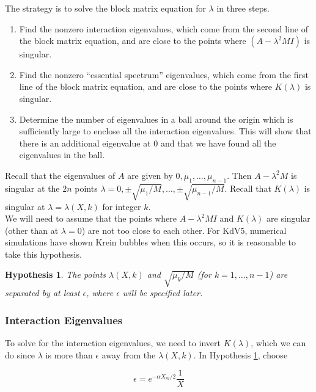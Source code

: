 \documentclass[12pt]{article}
\newtheorem{hypothesis}{Hypothesis}
\begin{document}
The strategy is to solve the block matrix equation for $\lambda$ in three steps.

\begin{enumerate}
	\item Find the nonzero interaction eigenvalues, which come from the second line of the block matrix equation, and are close to the points where $(A - \lambda^2 M I)$ is singular.
	\item Find the nonzero ``essential spectrum'' eigenvalues, which come from the first line of the block matrix equation, and are close to the points where $K(\lambda)$ is singular.
	\item Determine the number of eigenvalues in a ball around the origin which is sufficiently large to enclose all the interaction eigenvalues. This will show that there is an additional eigenvalue at 0 and that we have found all the eigenvalues in the ball.
\end{enumerate}

Recall that the eigenvalues of $A$ are given by $0, \mu_1, \dots, \mu_{n-1}$. Then $A - \lambda^2 M$ is singular at the $2n$ points $\lambda = 0, \pm \sqrt{\mu_1/M}, \dots, \pm \sqrt{\mu_{n-1}/M}$. Recall that $K(\lambda)$ is singular at $\lambda = \lambda(X, k)$ for integer $k$.\\

We will need to assume that the points where $A - \lambda^2 M I$ and $K(\lambda)$ are singular (other than at $\lambda = 0$) are not too close to each other. For KdV5, numerical simulations have shown Krein bubbles when this occurs, so it is reasonable to take this hypothesis.

\begin{hypothesis}\label{epsilonballs}
The points $\lambda(X, k)$ and $\sqrt{\mu_k/M}$ (for $k = 1, \dots, n-1$) are separated by at least $\epsilon$, where $\epsilon$ will be specified later. 
\end{hypothesis}

\subsubsection{Interaction Eigenvalues}

To solve for the interaction eigenvalues, we need to invert $K(\lambda)$, which we can do since $\lambda$ is more than $\epsilon$ away from the $\lambda(X,k)$. In Hypothesis \ref{epsilonballs}, choose

\[
\epsilon = e^{-\alpha X_m/2} \frac{1}{X}
\]
\end{document}
